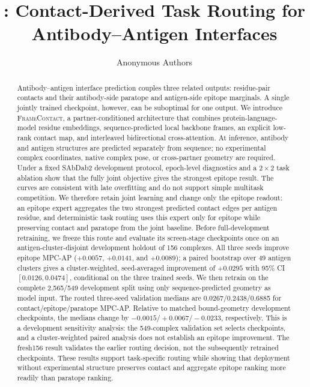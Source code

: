 \documentclass[10pt]{article}
\title{\method: Contact-Derived Task Routing for\\
Antibody--Antigen Interfaces}
\author{Anonymous Authors}
\date{}
\newcommand{\method}{\textsc{FrameContact}}
\newcommand{\mpcap}{MPC-AP}
\begin{document}
\maketitle

\begin{abstract}
Antibody--antigen interface prediction couples three related outputs: residue-pair
contacts and their antibody-side paratope and antigen-side epitope marginals. A
single jointly trained checkpoint, however, can be suboptimal for one output.
We introduce \method, a partner-conditioned architecture that combines
protein-language-model residue embeddings, sequence-predicted local backbone
frames, an explicit low-rank contact map, and interleaved bidirectional
cross-attention. At inference, antibody and antigen structures are predicted
separately from sequence; no experimental complex coordinates, native complex
pose, or cross-partner geometry are required. Under a
fixed SAbDab2 development protocol, epoch-level diagnostics and a $2\times2$
task ablation show that the fully joint objective gives the strongest epitope
result. The curves are consistent with late overfitting and do not support simple
multitask competition. We therefore retain joint learning
and change only the epitope readout: an epitope expert aggregates the two
strongest predicted contact edges per antigen residue, and deterministic task
routing uses this expert only for epitope while preserving contact and paratope
from the joint baseline. Before full-development retraining, we freeze this route
and evaluate its screen-stage checkpoints once on an antigen-cluster-disjoint
development holdout of 156 complexes. All three seeds improve epitope \mpcap{}
($+0.0057$, $+0.0141$, and $+0.0089$); a paired bootstrap over 49 antigen
clusters gives a cluster-weighted, seed-averaged improvement of $+0.0295$ with
95\% CI $[0.0126,0.0474]$, conditional on the three trained seeds. We then
retrain on the complete 2,565/549 development split using only
sequence-predicted geometry as model input. The routed three-seed validation
medians are 0.0267/0.2438/0.6885 for contact/epitope/paratope MPC-AP. Relative
to matched bound-geometry development checkpoints, the medians change by
$-0.0015/+0.0067/-0.0233$, respectively. This is a development sensitivity
analysis: the 549-complex validation set selects checkpoints, and a
cluster-weighted paired analysis does not establish an epitope improvement.
The fresh156 result validates the earlier routing decision, not the subsequently
retrained checkpoints. These results support task-specific routing while
showing that deployment without experimental structure preserves contact and
aggregate epitope ranking more readily than paratope ranking.
\end{abstract}
\end{document}
